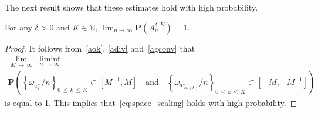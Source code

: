 \documentclass[AHL,Unicode,longabstracts,published]{cedram}
\newcommand{\N}{\mathbb N}
\newcommand{\bfP}{\mathbf{P}}
\newcommand\ex{\operatorname{ex}}
\newcommand{\aat}[1]{a_{\ex(#1)}^-}
\begin{document}
The next result shows that these estimates hold with high probability.

\begin{prop}\label{prop:Awhp}
For any $\delta>0$ and $K\in\N$, $\lim_{n\to\infty}\bfP(A^{\delta,K}_n)=1$.
\end{prop}
\begin{proof}
It follows from~\eqref{aok}, \eqref{adiv} and~\eqref{agconv} that
\begin{multline*}
\lim_{M\,\to\,\infty}\;\liminf_{n\,\to\,\infty}\\
\bfP\left(\left\{\omega_{a_k^+}/n\right\}_{0\,\le\,k\,\le\,K} \subset \left[M^{-1}, M\right] \quad\text{and}\quad 
\left\{\omega_{\aat{k}}/n\right\}_{0\,\le\,k \,\le\,K}\subset \left[-M,-M^{-1}\right]\right)
\end{multline*}
is equal to 1. This implies that~\eqref{eq:space_scaling} holds with high probability.


\end{proof}
\end{document}
